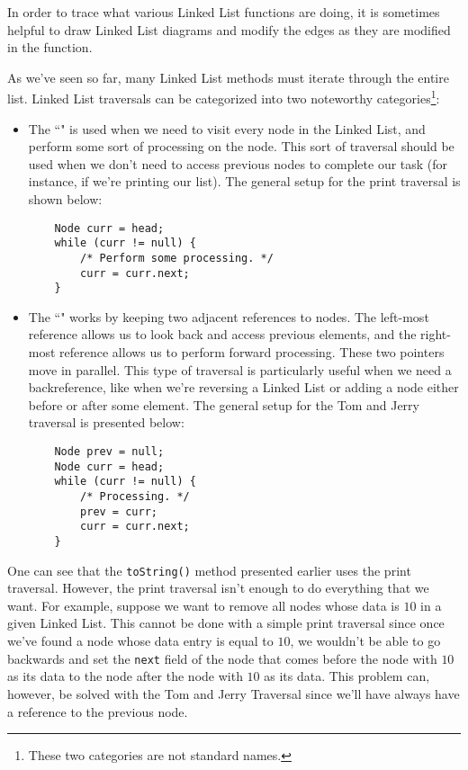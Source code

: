 In order to trace what various Linked List functions are doing, it is sometimes helpful to draw Linked List diagrams and modify the edges as they are modified in the function. 

As we've seen so far, many Linked List methods must iterate through the entire list. Linked List traversals can be categorized into two noteworthy categories\footnote{These two categories are not standard names.}:

\begin{itemize}
    \item The ``" is used when we need to visit every node in the Linked List, and perform some sort of processing on the node. This sort of traversal should be used when we don't need to access previous nodes to complete our task (for instance, if we're printing our list). The general setup for the print traversal is shown below:
    \begin{lstlisting}
    Node curr = head;
    while (curr != null) {
        /* Perform some processing. */
        curr = curr.next;
    }
    \end{lstlisting}
    \item The ``" works by keeping two adjacent references to nodes. The left-most reference allows us to look back and access previous elements, and the right-most reference allows us to perform forward processing. These two pointers move in parallel. This type of traversal is particularly useful when we need a backreference, like when we're reversing a Linked List or adding a node either before or after some element. The general setup for the Tom and Jerry traversal is presented below:
    \begin{lstlisting}
    Node prev = null;
    Node curr = head;
    while (curr != null) {
        /* Processing. */
        prev = curr;
        curr = curr.next;
    }
    \end{lstlisting}
\end{itemize}

One can see that the \verb!toString()! method presented earlier uses the print traversal. However, the print traversal isn't enough to do everything that we want. For example, suppose we want to remove all nodes whose data is $10$ in a given Linked List. This cannot be done with a simple print traversal since once we've found a node whose data entry is equal to $10$, we wouldn't be able to go backwards and set the \verb!next! field of the node that comes before the node with $10$ as its data to the node after the node with $10$ as its data. This problem can, however, be solved with the Tom and Jerry Traversal since we'll have always have a reference to the previous node.
